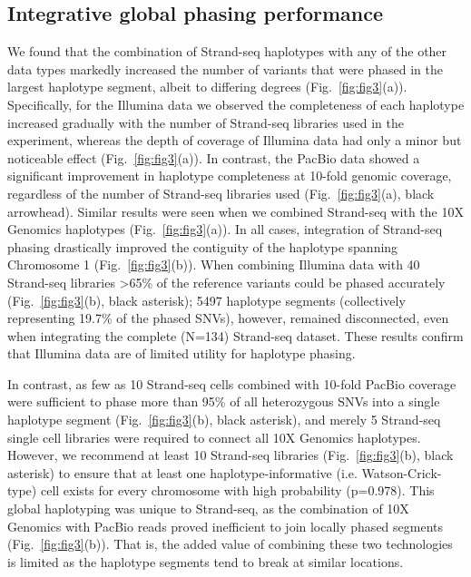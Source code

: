 \subsection{Integrative global phasing performance}
We found that the combination of Strand-seq haplotypes with any of the other data types markedly increased the number of variants that were phased in the largest haplotype segment, albeit to differing degrees (Fig.~\ref{fig:fig3}(a)). 
Specifically, for the Illumina data we observed the completeness of each haplotype increased gradually with the number of Strand-seq libraries used in the experiment, 
whereas the depth of coverage of Illumina data had only a minor but noticeable effect (Fig.~\ref{fig:fig3}(a)). 
In contrast, the PacBio data showed a significant improvement in haplotype completeness at 10-fold genomic coverage, 
regardless of the number of Strand-seq libraries used (Fig.~\ref{fig:fig3}(a), black arrowhead). 
Similar results were seen when we combined Strand-seq with the 10X Genomics haplotypes (Fig.~\ref{fig:fig3}(a)). 
In all cases, integration of Strand-seq phasing drastically improved the contiguity of the haplotype spanning Chromosome 1 (Fig.~\ref{fig:fig3}(b)). 
When combining Illumina data with 40 Strand-seq libraries >65\% of the reference variants could be phased accurately (Fig.~\ref{fig:fig3}(b), black asterisk); 
5497 haplotype segments (collectively representing 19.7\% of the phased SNVs), however, remained disconnected, even when integrating the complete (N=134) Strand-seq dataset. These results confirm that Illumina data are of limited utility for haplotype phasing.
    
    In contrast, as few as 10 Strand-seq cells combined with 10-fold PacBio coverage were sufficient to phase more than 95\% of all heterozygous SNVs into a single haplotype segment (Fig.~\ref{fig:fig3}(b), black asterisk), 
    and merely 5 Strand-seq single cell libraries were required to connect all 10X Genomics haplotypes. 
    However, we recommend at least 10 Strand-seq libraries (Fig.~\ref{fig:fig3}(b), black asterisk) to ensure that at least one haplotype-informative (i.e. Watson-Crick-type) cell exists for every chromosome with high probability (p=0.978).
    This global haplotyping was unique to Strand-seq, as the combination of 10X Genomics with PacBio reads proved inefficient to join locally phased segments (Fig.~\ref{fig:fig3}(b)). 
    That is, the added value of combining these two technologies is limited as the haplotype segments tend to break at similar locations.
    
